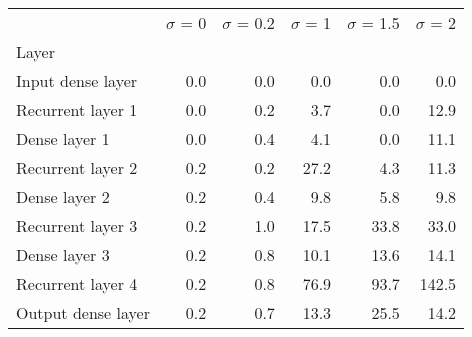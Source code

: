 \begin{tabular}{lrrrrr}
\toprule
{} &  $\sigma$  = 0 &  $\sigma$  = 0.2 &  $\sigma$  = 1 &  $\sigma$  = 1.5 &  $\sigma$  = 2 \\
Layer              &                &                  &                &                  &                \\
\midrule
Input dense layer  &            0.0 &              0.0 &            0.0 &              0.0 &            0.0 \\
Recurrent layer 1  &            0.0 &              0.2 &            3.7 &              0.0 &           12.9 \\
Dense layer 1      &            0.0 &              0.4 &            4.1 &              0.0 &           11.1 \\
Recurrent layer 2  &            0.2 &              0.2 &           27.2 &              4.3 &           11.3 \\
Dense layer 2      &            0.2 &              0.4 &            9.8 &              5.8 &            9.8 \\
Recurrent layer 3  &            0.2 &              1.0 &           17.5 &             33.8 &           33.0 \\
Dense layer 3      &            0.2 &              0.8 &           10.1 &             13.6 &           14.1 \\
Recurrent layer 4  &            0.2 &              0.8 &           76.9 &             93.7 &          142.5 \\
Output dense layer &            0.2 &              0.7 &           13.3 &             25.5 &           14.2 \\
\bottomrule
\end{tabular}
